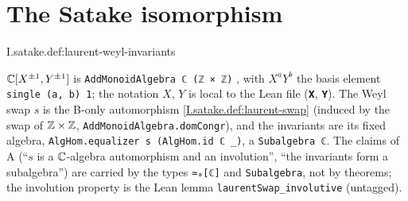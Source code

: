 \section{The Satake isomorphism}

\begin{definition}
\end{definition}
\begin{tfformal}{I.satake.def:laurent-weyl-invariants}
\begin{tffidelity}
$\mathbb{C}[X^{\pm1},Y^{\pm1}]$ is \texttt{AddMonoidAlgebra ℂ (ℤ × ℤ)} , with $X^aY^b$ the basis element \texttt{single (a, b) 1}; the notation $X$, $Y$ is local to the Lean file (\texttt{𝐗}, \texttt{𝐘}). The Weyl swap $s$ is the B-only automorphism \cref{I.satake.def:laurent-swap} (induced by the swap of $\mathbb{Z}\times\mathbb{Z}$, \texttt{AddMonoidAlgebra.domCongr}), and the invariants are its fixed algebra, \texttt{AlgHom.equalizer s (AlgHom.id ℂ \_)}, a \texttt{Subalgebra ℂ}. The claims of A (``$s$ is a $\mathbb{C}$-algebra automorphism and an involution'', ``the invariants form a subalgebra'') are carried by the types \texttt{≃ₐ[ℂ]} and \texttt{Subalgebra}, not by theorems; the involution property is the Lean lemma \texttt{laurentSwap\_involutive} (untagged).
\end{tffidelity}
\end{tfformal}

